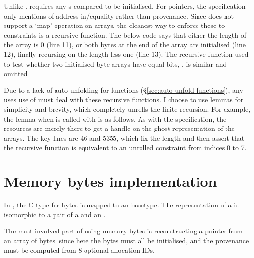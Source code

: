 
Unlike ,  requires any s compared
to be initialised. For pointers, the specification only mentions of address
in/equality rather than provenance. Since  does not support a %
`map' operation on arrays, the cleanest way to enforce these to constraints
is a recursive function. The below code says that either the length of the
array is 0 (line 11), or both bytes at the end of the array are initialised
(line 12), finally recursing on the length less one (line 13). The recursive
function used to test whether two initialised byte arrays have equal bits,
, is similar and omitted.


Due to a lack of auto-unfolding for functions
(\S\ref{sec:auto-unfold-functions}), any uses use of  must deal
with these recursive functions. I choose to use lemmas for simplicity and
brevity, which completely unrolls the finite recursion. For example, the lemma
when  is called with  is as follows. As with
the  specification, the resources are merely there to get a
handle on the ghost representation of the arrays. The key lines are 46 and
53\textendash{}55, which fix the length and then assert that the recursive
function is equivalent to an unrolled constraint from indices 0 to 7.


\section{Memory bytes implementation}\label{sec:mem-bytes-impl}

In , the C type for bytes is mapped to an 
basetype. The representation of a  is isomorphic to a pair
of a  and an .

The most involved part of using memory bytes is reconstructing a pointer from
an array of bytes, since here the bytes must all be initialised, and the
provenance must be computed from 8 optional allocation IDs.

